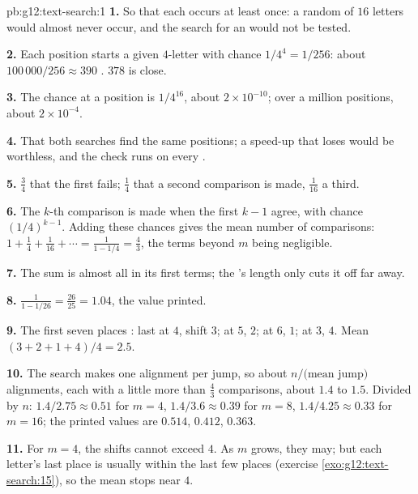 \begin{solution}{pb:g12:text-search:1}
\textbf{1.} So that each  occurs at least once: a random  of $16$ letters would almost never occur, and
the search for an  would not be tested.

\textbf{2.} Each position starts a given $4$-letter  with chance $1/4^4 = 1/256$: about $100\,000 / 256 \approx
390$ . $378$ is close.

\textbf{3.} The chance at a position is $1/4^{16}$, about $2 \times 10^{-10}$; over a million positions, about
$2 \times 10^{-4}$.

\textbf{4.} That both searches find the same positions; a speed-up that loses  would be worthless, and the
check runs on every .

\textbf{5.} $\frac34$ that the first fails; $\frac14$ that a second comparison is made, $\frac1{16}$ a third.

\textbf{6.} The $k$-th comparison is made when the first $k - 1$ agree, with chance $(1/4)^{k-1}$. Adding these
chances gives the mean number of comparisons: $1 + \frac14 + \frac1{16} + \dotsb = \frac{1}{1 - 1/4} = \frac43$,
the terms beyond $m$ being negligible.

\textbf{7.} The sum is almost all in its first terms; the 's length only cuts it off far away.

\textbf{8.} $\frac{1}{1 - 1/26} = \frac{26}{25} = 1.04$, the value printed.

\textbf{9.} The first seven places :  last at $4$, shift $3$;  at $5$, $2$;  at
$6$, $1$;  at $3$, $4$. Mean $(3 + 2 + 1 + 4)/4 = 2.5$.

\textbf{10.} The search makes one alignment per jump, so about $n / \text{(mean jump)}$ alignments, each with a little
more than $\frac43$ comparisons, about $1.4$ to $1.5$. Divided by $n$: $1.4 / 2.75 \approx 0.51$ for $m = 4$,
$1.4 / 3.6 \approx 0.39$ for $m = 8$, $1.4 / 4.25 \approx 0.33$ for $m = 16$; the printed values are $0.514$,
$0.412$, $0.363$.

\textbf{11.} For $m = 4$, the shifts cannot exceed $4$. As $m$ grows, they may; but each letter's last place is
usually within the last few places (exercise \ref{exo:g12:text-search:15}), so the mean stops near $4$.


\end{solution}
